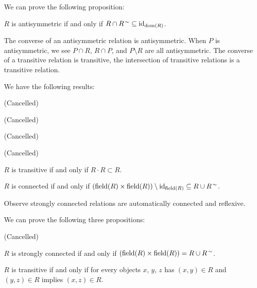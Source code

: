 \documentclass{article}
\begin{document}
We can prove the following proposition:
\begin{thm}
\item\label{relat2:22} $R$ is antisymmetric if and only if $R\cap R^{\,\sim}\subseteq\operatorname{id}_{\operatorname{dom}(R)}$.
\end{thm}

The converse of an antisymmetric relation is antisymmetric. When $P$ is
antisymmetric, we see $P\cap R$, $R\cap P$, and $P\setminus R$ are all
antisymmetric. The converse of a transitive relation is transitive, the
intersection of transitive relations is a transitive relation.

We have the following results:
\begin{thm}
\item\label{relat2:23} (Cancelled)
\item\label{relat2:24} (Cancelled)
\item\label{relat2:25} (Cancelled)
\item\label{relat2:26} (Cancelled)
\item\label{relat2:27} $R$ is transitive if and only if $R\cdot R\subset R$.
\item\label{relat2:28} $R$ is connected if and only if
  $(\operatorname{field}(R)\times\operatorname{field}(R))\setminus\operatorname{id}_{\operatorname{field}(R)}\subseteq R\cup R^{\,\sim}$.
\end{thm}

Observe strongly connected relations are automatically connected and reflexive.

We can prove the following three propositions:
\begin{thm}
\item\label{relat2:29} (Cancelled)
\item\label{relat2:30} $R$ is strongly connected if and only if
  $(\operatorname{field}(R)\times\operatorname{field}(R))=R\cup R^{\,\sim}$.
\item\label{relat2:31} $R$ is transitive if and only if for every
  objects $x$, $y$, $z$ has $(x,y)\in R$ and $(y,z)\in R$ implies
  $(x,z)\in R$.
\end{thm}
\end{document}
